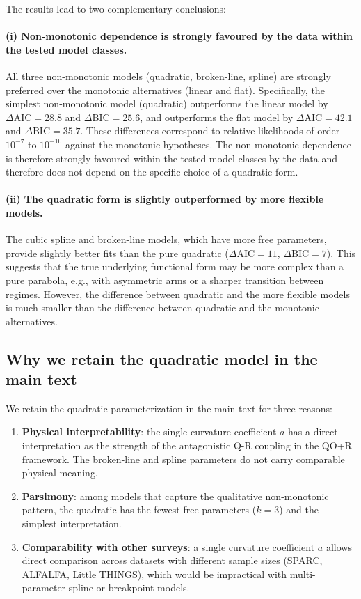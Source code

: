 The results lead to two complementary conclusions:

\paragraph{(i) Non-monotonic dependence is strongly favoured by the data within the tested model classes.}
All three non-monotonic models (quadratic, broken-line, spline) are
strongly preferred over the monotonic alternatives (linear and flat).
Specifically, the simplest non-monotonic model (quadratic) outperforms
the linear model by $\Delta\mathrm{AIC} = 28.8$ and $\Delta\mathrm{BIC} = 25.6$,
and outperforms the flat model by $\Delta\mathrm{AIC} = 42.1$ and
$\Delta\mathrm{BIC} = 35.7$. These differences correspond to relative
likelihoods of order $10^{-7}$ to $10^{-10}$ against the monotonic
hypotheses. The non-monotonic dependence is therefore strongly favoured within the tested model classes
by the data and therefore does not depend on the specific choice of a quadratic form.

\paragraph{(ii) The quadratic form is slightly outperformed by more flexible models.}
The cubic spline and broken-line models, which have more free parameters,
provide slightly better fits than the pure quadratic ($\Delta\mathrm{AIC} = 11$,
$\Delta\mathrm{BIC} = 7$). This suggests that the true underlying
functional form may be more complex than a pure parabola, e.g., with
asymmetric arms or a sharper transition between regimes. However, the
difference between quadratic and the more flexible models is much smaller
than the difference between quadratic and the monotonic alternatives.

\subsection*{Why we retain the quadratic model in the main text}

We retain the quadratic parameterization in the main text for three
reasons:

\begin{enumerate}
    \item \textbf{Physical interpretability}: the single curvature
    coefficient $a$ has a direct interpretation as the strength of the
    antagonistic Q-R coupling in the QO+R framework. The broken-line
    and spline parameters do not carry comparable physical meaning.

    \item \textbf{Parsimony}: among models that capture the qualitative
    non-monotonic pattern, the quadratic has the fewest free parameters
    ($k = 3$) and the simplest interpretation.

    \item \textbf{Comparability with other surveys}: a single curvature
    coefficient $a$ allows direct comparison across datasets with
    different sample sizes (SPARC, ALFALFA, Little THINGS), which would
    be impractical with multi-parameter spline or breakpoint models.
\end{enumerate}

